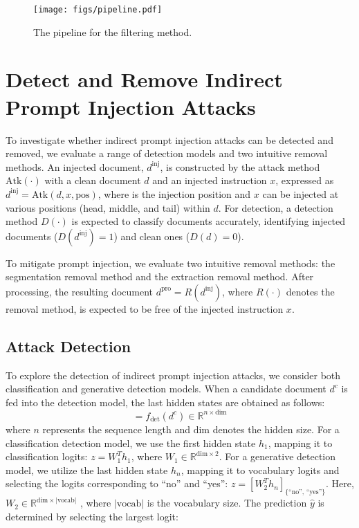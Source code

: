 \begin{figure}
    \centering
    \texttt{[image: figs/pipeline.pdf]}
    \caption{The pipeline for the filtering method.}
    \label{fig:pipeline}
   \vspace{-15pt}
\end{figure}
\section{Detect and Remove Indirect Prompt Injection Attacks}
To investigate whether indirect prompt injection attacks can be detected and removed, we evaluate a range of detection models and two intuitive removal methods. An injected document, $d^{\text{inj}}$, is constructed by the attack method $\text{Atk}(\cdot)$ with a clean document  $d$ and an injected instruction  $x$, expressed as  $d^{\text{inj}} = \text{Atk}(d, x, \text{pos})$, where  is the injection position and $x$  can be injected at various positions (head, middle, and tail) within  $d$.
For detection, a detection method  $D(\cdot)$  is expected to classify documents accurately, identifying injected documents ($ D(d^{\text{inj}}) = 1 $) and clean ones ($D(d) = 0$).

To mitigate prompt injection, we evaluate two intuitive removal methods: the segmentation removal method and the extraction removal method. After processing, the resulting document  $d^{\text{pro}} = R(d^{\text{inj}})$, where  $R(\cdot)$  denotes the removal method, is expected to be free of the injected instruction $x$.

\subsection{Attack Detection}
To explore the detection of indirect prompt injection attacks, we consider both classification and generative detection models. When a candidate document  $d^c$  is fed into the detection model, the last hidden states are obtained as follows:
\begin{equation}
    [h_1, h_2 \cdots h_n] = f_{\text{det}}(d^{c}) \in  {\mathbb R}^{n \times \text{dim}}
\end{equation}
where  $n$  represents the sequence length and  $\text{dim}$  denotes the hidden size.
For a classification detection model, we use the first hidden state  $h_1$, mapping it to classification logits: $z = W_1^T h_1$, where $W_1 \in \mathbb R^{\text{dim} \times 2}$. For a generative detection model, we utilize the last hidden state  $h_n$, mapping it to vocabulary logits and selecting the logits corresponding to ``no'' and ``yes'': $z = \left[ W_2^T h_n \right]_{\{\text{``no'', ``yes''}\}}$. Here,  $W_2 \in \mathbb{R}^{\text{dim} \times \left|\text{vocab}\right|}$ , where  $\left|\text{vocab}\right|$  is the vocabulary size. The prediction  $\hat{y}$  is determined by selecting the largest logit:

